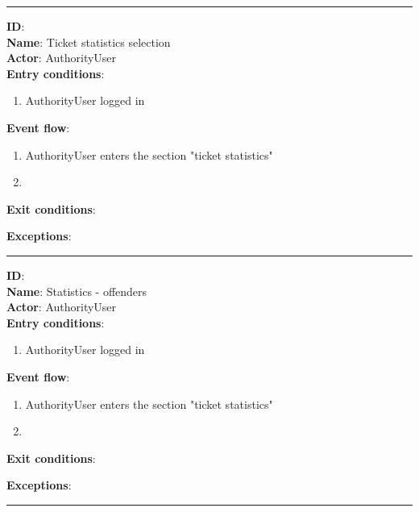 		\rule{\linewidth}{0.4pt}
    \textbf{ID}:  \\
    \textbf{Name}: Ticket statistics selection \\
    \textbf{Actor}: AuthorityUser   \\
    \textbf{Entry conditions}:
    \begin{enumerate}
      \item{AuthorityUser logged in}
    \end{enumerate}
    \textbf{Event flow}:
    \begin{enumerate}
      \item {AuthorityUser enters the section "ticket statistics"}
      \item
    \end{enumerate}
    \textbf{Exit conditions}:
    \begin{enumerate}

    \end{enumerate}
    \textbf{Exceptions}:
    \begin{enumerate}

    \end{enumerate}
    \rule{\linewidth}{0.4pt}

    \textbf{ID}:  \\
    \textbf{Name}: Statistics - offenders \\
    \textbf{Actor}: AuthorityUser   \\
    \textbf{Entry conditions}:
    \begin{enumerate}
      \item{AuthorityUser logged in}
    \end{enumerate}
    \textbf{Event flow}:
    \begin{enumerate}
      \item {AuthorityUser enters the section "ticket statistics"}
      \item
    \end{enumerate}
    \textbf{Exit conditions}:
    \begin{enumerate}

    \end{enumerate}
    \textbf{Exceptions}:
    \begin{enumerate}

    \end{enumerate}
    \rule{\linewidth}{0.4pt}

